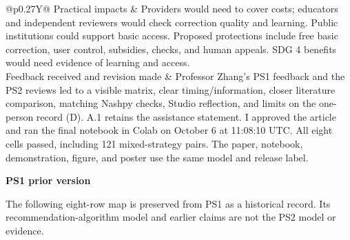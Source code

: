 \begin{table}[H]
\begin{tabularx}{\textwidth}{@{}p{}Y@{}}
Practical impacts & Providers would need to cover costs; educators and independent reviewers would check correction quality and learning. Public institutions could support basic access. Proposed protections include free basic correction, user control, subsidies, checks, and human appeals. SDG 4 benefits would need evidence of learning and access.\\
Feedback received and revision made & Professor Zhang's PS1 feedback and the PS2 reviews led to a visible matrix, clear timing/information, closer literature comparison, matching Nashpy checks, Studio reflection, and limits on the one-person record (D). A.1 retains the assistance statement. I approved the article and ran the final notebook in Colab on October 6 at 11:08:10 UTC. All eight cells passed, including 121 mixed-strategy pairs. The paper, notebook, demonstration, figure, and poster use the same model and release label.\\
\bottomrule\end{tabularx}\end{table}

\clearpage
\noindent\textbf{PS1 prior version}\par

The following eight-row map is preserved from PS1 as a historical record. Its recommendation-algorithm model and earlier claims are not the PS2 model or evidence.

